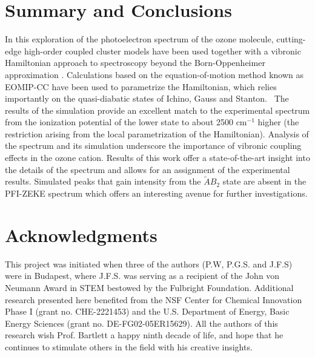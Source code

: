 \documentclass[
12pt,
a4paper,
prb,
superscriptaddress,
]{revtex4}
\begin{document}
\section{Summary and Conclusions} 

In this exploration of the photoelectron spectrum of the ozone molecule,
cutting-edge high-order coupled cluster models have been used together with a
vibronic Hamiltonian approach to spectroscopy beyond the Born-Oppenheimer
approximation \cite{Cederbaum:LVC:84, KDC:81, Koppel:CIbookCh7:04}.
Calculations based on the equation-of-motion method known as EOMIP-CC have
been used to parametrize the Hamiltonian, which relies importantly on the
quasi-diabatic states of Ichino, Gauss and Stanton.~\cite{Stanton:EOMIPdeg:09}
The results of the simulation provide an excellent match to the experimental
spectrum from the ionization potential of the lower state to about 2500
cm$^{-1}$ higher (the restriction arising from the local parametrization of
the Hamiltonian).  Analysis of the spectrum and its simulation underscore the
importance of vibronic coupling effects in the ozone cation.  Results of this
work offer a state-of-the-art insight into the details of the spectrum and
allows for an assignment of the experimental results.  Simulated peaks that
gain intensity from the ${\tilde A}B_2$ state are absent in the PFI-ZEKE
spectrum which offers an interesting avenue for further investigations. 

\section{Acknowledgments} 

This project was initiated when three of the authors (P.W, P.G.S. and J.F.S)
were in Budapest, where J.F.S. was serving as a recipient of the John von
Neumann Award in STEM bestowed by the Fulbright Foundation. Additional
research presented here benefited from the NSF Center for Chemical Innovation
Phase I (grant no. CHE-2221453) and the U.S. Department of Energy, Basic Energy
Sciences (grant no. DE-FG02-05ER15629).  All the authors of this research wish
Prof. Bartlett a happy ninth decade of life, and hope that he continues to
stimulate others in the field with his creative insights.

\clearpage


\end{document}
